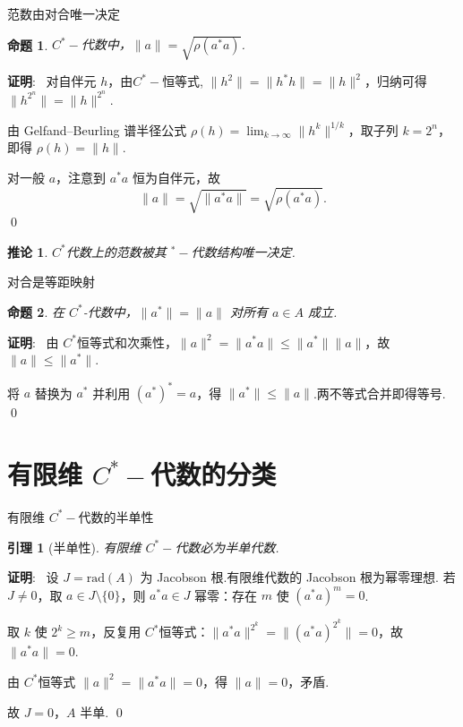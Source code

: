 \documentclass[notheorems,11pt]{beamer}
\theoremstyle{plain}
\numberwithin{theorem}{section}
\newtheorem{lemma}{引理}
\numberwithin{lemma}{section}
\newtheorem{proposition}{命题}
\newtheorem{corollary}{{推论}}
\numberwithin{corollary}{section}
\theoremstyle{example}
\renewenvironment{proof}[1][证明]{\textbf{#1}:~}{\qed\par}
\begin{document}
\begin{frame}{范数由对合唯一决定}
  \setcounter{proposition}{0}
  \begin{proposition}
    $C^*-\!$代数中，$\|a\| = \sqrt{\rho(a^*a)}$.
  \end{proposition}
  \begin{proof}
    对自伴元 $h$，由$C^*-\!$恒等式, $\|h^2\| = \|h^*h\| = \|h\|^2$，归纳可得 $\|h^{2^n}\| = \|h\|^{2^n}$.\par
    由 Gelfand--Beurling 谱半径公式 $\rho(h) = \lim_{k \to \infty} \|h^k\|^{1/k}$，取子列 $k = 2^n$，即得 $\rho(h) = \|h\|$.\par
    对一般 $a$，注意到 $a^*a$ 恒为自伴元，故
    \begin{equation*}
        \|a\| = \sqrt{\|a^*a\|} = \sqrt{\rho(a^*a)}.
    \end{equation*}
\end{proof}
  \begin{corollary}
    $C^*$代数上的范数被其 ${}^*-\!$代数结构\alert{唯一决定}.
  \end{corollary}
\end{frame}

\begin{frame}{对合是等距映射}
  \begin{proposition}\label{prop:isometry}
    在 $C^*$-代数中，$\|a^*\| = \|a\|$ 对所有 $a \in A$ 成立.
  \end{proposition}
  \pause
  \begin{proof}\small
    由 $C^*$恒等式和次乘性，$\|a\|^2 = \|a^*a\| \le \|a^*\|\|a\|$，故 $\|a\| \le \|a^*\|$.\par
    将 $a$ 替换为 $a^*$ 并利用 $(a^*)^* = a$，得 $\|a^*\| \le \|a\|$.两不等式合并即得等号.
  \end{proof}
\end{frame}



\section{有限维 $C^*-\!$代数的分类}

\begin{frame}{有限维 $C^*-\!$代数的半单性}
  \setcounter{lemma}{1}
  \begin{lemma}[半单性]\label{lem:semisimple-beamer}
    有限维 $C^*-\!$代数必为半单代数.
  \end{lemma}
  \pause
  \begin{proof}\small
    设 $J = \mathrm{rad}(A)$ 为 Jacobson 根.有限维代数的 Jacobson 根为幂零理想.
    若 $J \neq 0$，取 $a \in J \setminus \{0\}$，则 $a^*a \in J$ 幂零：存在 $m$ 使 $(a^*a)^m = 0$.\par
    取 $k$ 使 $2^k \ge m$，反复用 $C^*$恒等式：$\|a^*a\|^{2^k} = \|(a^*a)^{2^k}\| = 0$，故 $\|a^*a\| = 0$.\par
    由 $C^*$恒等式 $\|a\|^2 = \|a^*a\| = 0$，得 $\|a\| = 0$，矛盾.\par
    故 $J = 0$，$A$ 半单.
  \end{proof}
\end{frame}
\end{document}

